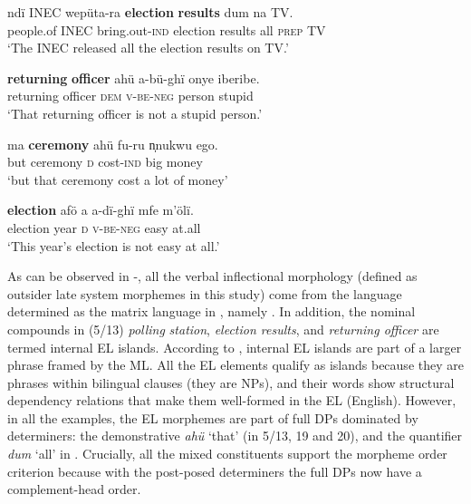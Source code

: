 \documentclass[output=paper]{langsci/langscibook}
\begin{document}
\ea\label{ex:ihemere:18}
\gll ndï    INEC  wepüta-ra  \textbf{election} \textbf{results}   dum  na  TV.\\
     people.of  INEC  bring.out-\textsc{ind}   election results  all  \textsc{prep}  TV\\
\glt ‘The INEC released all the election results on TV.’    
\z

\ea\label{ex:ihemere:19}
\gll \textbf{returning} \textbf{officer}  ahü       a-bü-ghï        onye    iberibe.\\
     returning officer     \textsc{dem}  \textsc{v-be-neg}  person  stupid\\
\glt ‘That returning officer is not a stupid person.’
\z

\ea\label{ex:ihemere:20}
\gll ma  \textbf{ceremony}   ahü  fu-ru      n̩nukwu   ego.\\
     but ceremony  \textsc{d}  cost-\textsc{ind}  big    money\\
\glt ‘but that ceremony cost a lot of money’
\z

\ea\label{ex:ihemere:21}
\gll \textbf{election}  afö  a  a-dï-ghï  mfe  m’ölï.\\
     election    year  \textsc{d}  \textsc{v-be-neg}  easy  at.all\\
\glt ‘This year’s election is not easy at all.’
\z

As can be observed in -, all the verbal inflectional morphology (defined as outsider late system morphemes in this study) come from the language determined as the matrix language in , namely . In addition, the nominal compounds in (5/13) \textit{polling}\textbf{\textit{}} \textit{station},  \textit{election results}, and  \textit{returning officer} are termed internal EL islands. According to \citet[265]{MyersScotton2006}, internal EL islands are part of a larger phrase framed by the ML. All the EL elements qualify as islands because they are phrases within bilingual clauses (they are NPs), and their words show structural dependency relations that make them well-formed in the EL (English). However, in all the examples, the EL morphemes are part of full DPs dominated by  determiners: the demonstrative \textit{ahü} ‘that’ (in 5/13, 19 and 20), and the quantifier \textit{dum} ‘all’ in . Crucially, all the mixed constituents support the morpheme order criterion because with the post-posed  determiners the full DPs now have a complement-head order. 
\end{document}
